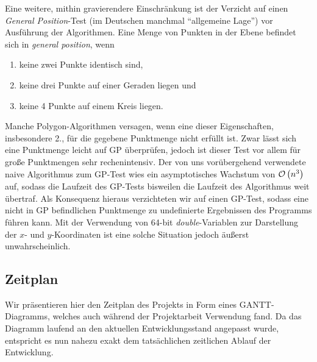 Eine weitere, mithin gravierendere Einschränkung ist der Verzicht auf einen \emph{General Position}-Test (im Deutschen manchmal \enquote{allgemeine Lage}) vor Ausführung der Algorithmen. Eine Menge von Punkten in der Ebene befindet sich in \emph{general position}, wenn
\begin{enumerate}
\item keine zwei Punkte identisch sind,
\item keine drei Punkte auf einer Geraden liegen und
\item keine 4 Punkte auf einem Kreis liegen.
\end{enumerate}
Manche Polygon-Algorithmen versagen, wenn eine dieser Eigenschaften, insbesondere 2., für die gegebene Punktmenge nicht erfüllt ist. Zwar lässt sich eine Punktmenge leicht auf GP überprüfen, jedoch ist dieser Test vor allem für große Punktmengen sehr rechenintensiv. Der von uns vorübergehend verwendete naive Algorithmus zum GP-Test wies ein asymptotisches Wachstum von $\mathcal{O}\left(n^3\right)$ auf, sodass die Laufzeit des GP-Tests bisweilen die Laufzeit des Algorithmus weit übertraf. Als Konsequenz hieraus verzichteten wir auf einen GP-Test, sodass eine nicht in GP befindlichen Punktmenge zu undefinierte Ergebnissen des Programms führen kann. Mit der Verwendung von 64-bit \emph{double}-Variablen zur Darstellung der $x$- und $y$-Koordinaten ist eine solche Situation jedoch äußerst unwahrscheinlich.

\subsection{Zeitplan}
Wir präsentieren hier den Zeitplan des Projekts in Form eines GANTT-Diagramms, welches auch während der Projektarbeit Verwendung fand. Da das Diagramm laufend an den aktuellen Entwicklungsstand angepasst wurde, entspricht es nun nahezu exakt dem tatsächlichen zeitlichen Ablauf der Entwicklung.

